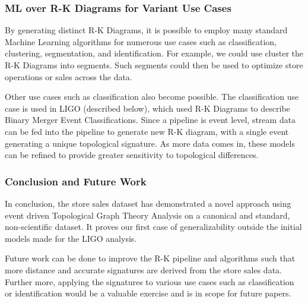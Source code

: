 \subsubsection{ML over R-K Diagrams for Variant Use Cases}
\label{sec:classification}

By generating distinct R-K Diagrams, it is possible to employ many standard Machine Learning algorithms for numerous use cases such as classification, clustering, segmentation, and identification. For example, we could use cluster the R-K Diagrams into segments. Such segments could then be used to optimize store operations or sales across the data.

Other use cases such as classification also become possible. The classification use case is used in LIGO (described below), which used R-K Diagrams to describe Binary Merger Event Classifications. Since a pipeline is event level, stream data can be fed into the pipeline to generate new R-K diagram, with a single event generating a unique topological signature. As more data comes in, these models can be refined to provide greater sensitivity to topological differences.


\subsubsection{Conclusion and Future Work}

In conclusion, the store sales dataset has demonstrated a novel approach using event driven Topological Graph Theory Analysis on a canonical and standard, non-scientific dataset. It proves our first case of generalizability outside the initial models made for the LIGO analysis.

Future work can be done to improve the R-K pipeline and algorithms such that more distance and accurate signatures are derived from the store sales data. Further more, applying the signatures to various use cases such as classification or identification would be a valuable exercise and is in scope for future papers.
